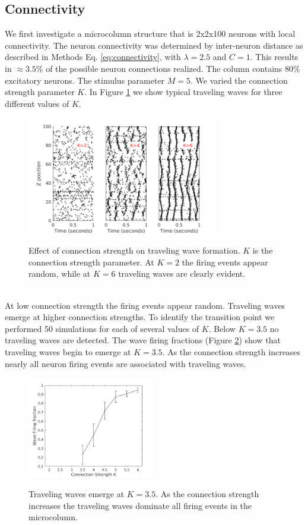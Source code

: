 \documentclass[a4paper,11pt]{article}
\begin{document}
\subsection{Connectivity}
We first investigate a microcolumn structure that is 2x2x100 neurons with local connectivity. 
The neuron connectivity was determined by inter-neuron distance as described in Methods Eq. \ref{eq:connectivity}, with $\lambda=2.5$ and $C=1$.
This results in $\approx 3.5\%$ of the possible neuron connections realized.  
The column contains $80\%$ excitatory neurons.
The stimulus parameter $M=5$.
We varied the connection strength parameter $K$.
In Figure \ref{fig:strength_effect} we show typical traveling waves for three different values of $K$.
\begin{figure}[!htb]
 \caption{Effect of connection strength on traveling wave formation. $K$ is the connection strength parameter. At $K=2$ the firing events appear random, while at $K=6$ traveling waves are clearly evident.}
 \centering
   \includegraphics[width=0.75\textwidth]{fig/ConnectionStrengthWaves}  
 \label{fig:strength_effect}
\end{figure}
\\
At low connection strength the firing events appear random.
Traveling waves emerge at higher connection strengths. 
To identify the transition point we performed 50 simulations for each of several values of $K$.
Below $K=3.5$ no traveling waves are detected.
The wave firing fractions (Figure \ref{fig:conn_fraction}) show that traveling waves begin to emerge at $K=3.5$.
As the connection strength increases nearly all neuron firing events are associated with traveling waves. 
\begin{figure}[!htb]
 \caption{Traveling waves emerge at $K=3.5$. As the connection strength increases the traveling waves dominate all firing events in the microcolumn.}
 \centering
   \includegraphics[width=0.5\textwidth]{fig/ConnectionStrengthWaveFraction}  
 \label{fig:conn_fraction}
\end{figure}
\\
\end{document}
